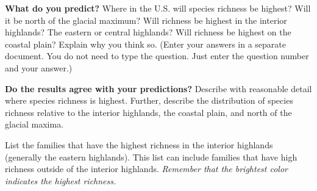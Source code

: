 \documentclass[11pt, addpoints]{exam}
\begin{document}
\begin{questions}

\question
\textbf{What do you predict?} Where in the U.S. will species richness be highest? Will it be north of the glacial maximum? Will richness be highest in the interior highlands? The eastern or central highlands? Will richness be highest on the coastal plain? Explain why you think so. (Enter your answers in a separate document. You do not need to type the question. Just enter the question number and your answer.)



\question
\textbf{Do the results agree with your predictions?} Describe with 
reasonable detail where species richness is highest. Further, describe 
the distribution of species richness relative to the interior highlands,
the coastal plain, and north of the glacial maxima.



\question
List the families that have the highest richness in the interior highlands (generally the eastern highlands). This list can include families that have high richness outside of the interior
highlands. \textit{Remember that the brightest color indicates the 
highest richness.}


\end{questions}
\end{document}

